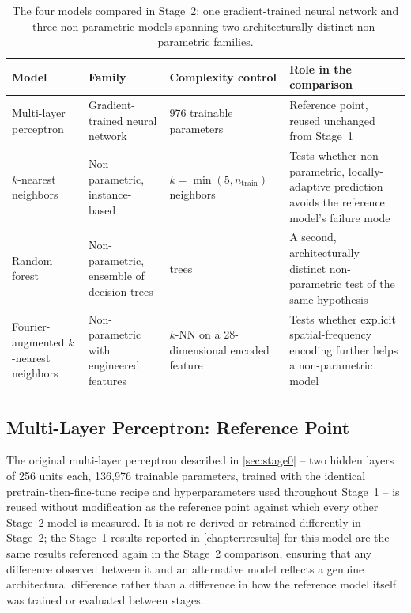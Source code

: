 \documentclass{iutbscthesis}
\begin{document}
\begin{table}[htbp]
    \centering
    \begin{tabularx}{\textwidth}{
        >{\raggedright\arraybackslash}X
        >{\raggedright\arraybackslash}X
        >{\raggedright\arraybackslash}X
        >{\raggedright\arraybackslash}X
    }
        \toprule
        Model & Family & Complexity control & Role in the comparison \\
        \midrule

        Multi-layer perceptron
        & Gradient-trained neural network
        & 136{,}976 trainable parameters
        & Reference point, reused unchanged from Stage~1 \\

        $k$-nearest neighbors
        & Non-parametric, instance-based
        & $k = \min(5, n_{\text{train}})$ neighbors
        & Tests whether non-parametric, locally-adaptive prediction avoids the reference model's failure mode \\

        Random forest
        & Non-parametric, ensemble of decision trees
        & 200 trees
        & A second, architecturally distinct non-parametric test of the same hypothesis \\

        Fourier-augmented $k$-nearest neighbors
        & Non-parametric with engineered features
        & $k$-NN on a 28-dimensional encoded feature
        & Tests whether explicit spatial-frequency encoding further helps a non-parametric model \\

        \bottomrule
    \end{tabularx}

    \caption{The four models compared in Stage~2: one gradient-trained neural network and three non-parametric models spanning two architecturally distinct non-parametric families.}

    \label{tab:modelfamilies}
\end{table}

\subsection{Multi-Layer Perceptron: Reference Point}
\label{sec:mlpstage2}

The original multi-layer perceptron described in \autoref{sec:stage0} -- two hidden layers of 256 units each, 136{,}976 trainable parameters, trained with the identical pretrain-then-fine-tune recipe and hyperparameters used throughout Stage~1 -- is reused without modification as the reference point against which every other Stage~2 model is measured. It is not re-derived or retrained differently in Stage~2; the Stage~1 results reported in \autoref{chapter:results} for this model are the same results referenced again in the Stage~2 comparison, ensuring that any difference observed between it and an alternative model reflects a genuine architectural difference rather than a difference in how the reference model itself was trained or evaluated between stages.
\end{document}
